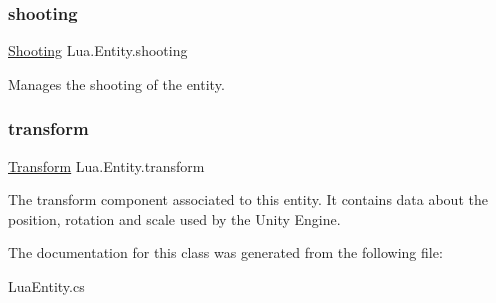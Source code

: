 \subsubsection{\texorpdfstring{shooting}{shooting}}
{\footnotesize\ttfamily \mbox{\hyperlink{class_lua_1_1_shooting}{Shooting}} Lua.\+Entity.\+shooting\hspace{0.3cm}{\ttfamily [get]}}



Manages the shooting of the entity. 

\mbox{\label{class_lua_1_1_entity_a51edf8c42bd2acb730ae73d045341320}} 
\subsubsection{\texorpdfstring{transform}{transform}}
{\footnotesize\ttfamily \mbox{\hyperlink{class_lua_1_1_transform}{Transform}} Lua.\+Entity.\+transform\hspace{0.3cm}{\ttfamily [get]}}



The transform component associated to this entity. It contains data about the position, rotation and scale used by the Unity Engine. 



The documentation for this class was generated from the following file\+:\begin{DoxyCompactItemize}
\item 
Lua\+Entity.\+cs\end{DoxyCompactItemize}
